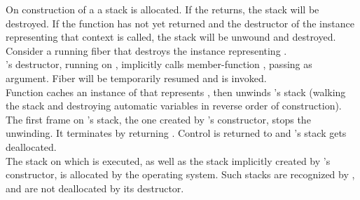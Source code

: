 \label{destruction}

On construction of a \fiber a stack is allocated. If the \entryfn returns,
the stack will be destroyed. If the function has not yet returned and the
destructor of the \fiber instance representing that context is called,
the stack will be unwound and destroyed.\\

Consider a running fiber  that destroys the \fiber instance
representing .\\

's destructor, running on , implicitly calls member-function
\resumewith, passing \unwindfib as
argument. Fiber  will be temporarily resumed and \unwindfib is
invoked.\\
Function \unwindfib caches an instance of \fiber that
represents , then unwinds 's stack
(walking the stack and destroying automatic variables in reverse order of
construction).
The first frame on 's stack, the one created by \fiber's constructor,
stops the unwinding. It terminates  by returning
. Control is returned to  and 's
stack gets deallocated.\\

The stack on which \main is executed, as well as the stack implicitly
created by \thread's constructor, is allocated by the operating
system. Such stacks are recognized by \fiber, and are not deallocated by its
destructor.
